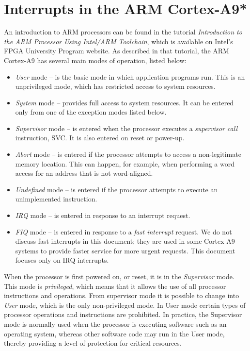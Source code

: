 \documentclass[11pt, twoside, pdftex]{article}
\begin{document}
\section{Interrupts in the ARM Cortex-A9*}
An introduction to ARM processors can be found in the tutorial {\it Introduction to the
ARM Processor Using Intel/ARM Toolchain},  which is available on Intel's FPGA University 
Program website.  As described in that tutorial, the ARM Cortex-A9 has several main modes of 
operation, listed below:
\begin{itemize}
\item {\it User} mode -- is the basic mode in which application
programs run. This is an unprivileged mode, which has restricted
access to system resources.
\item {\it System} mode -- provides full access to system
resources. It can be entered only from one of the exception
modes listed below.
\item {\it Supervisor} mode -- is entered when the processor executes
a {\it supervisor call} instruction, SVC. It is also entered on reset or power-up.
\item {\it Abort} mode -- is entered if the processor attempts to access a non-legitimate memory
		  location. This can happen, for example, when performing a word access for
		  an address that is not word-aligned.
\item {\it Undefined} mode -- is entered if the processor
attempts to execute an unimplemented instruction.
\item {\it IRQ} mode -- is entered in response to an interrupt request.
\item {\it FIQ} mode -- is entered in response to a {\it fast interrupt} request. We do not 
discuss fast interrupts in this document; they are used in some Cortex-A9 systems to 
provide faster service for more urgent requests. This document focuses only on IRQ interrupts.
\end{itemize}

When the processor is first powered on, or reset, it is in the {\it Supervisor}
mode. This mode is {\it privileged}, which means that it allows the use of all processor
instructions and operations. From supervisor mode it is possible to 
change into {\it User} mode, which is the only non-privileged mode. In User mode certain types
of processor operations and instructions are prohibited. In practice, the Supervisor mode is 
normally used when the processor is executing software such as an operating system,
whereas other software code may run in the User mode, thereby providing a level of protection 
for critical resources.
\end{document}
